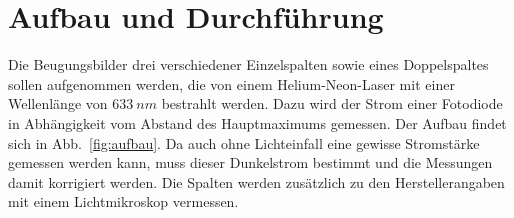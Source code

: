 \section {Aufbau und Durchführung}
\label{sec:durchführung}

Die Beugungsbilder drei verschiedener Einzelspalten sowie eines Doppelspaltes sollen aufgenommen werden, die von einem Helium-Neon-Laser mit einer Wellenlänge von $\SI{633}{nm}$ bestrahlt werden. Dazu wird der Strom einer Fotodiode in Abhängigkeit vom Abstand des Hauptmaximums gemessen. Der Aufbau findet sich in Abb.~\ref{fig:aufbau}.
Da auch ohne Lichteinfall eine gewisse Stromstärke gemessen werden kann, muss dieser Dunkelstrom bestimmt und die Messungen damit korrigiert werden. Die Spalten werden zusätzlich zu den Herstellerangaben mit einem Lichtmikroskop vermessen.
